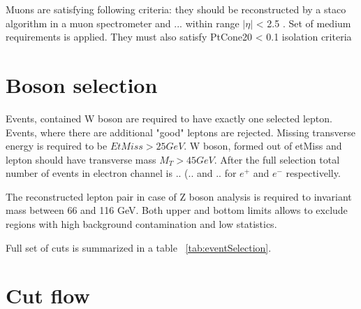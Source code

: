 Muons are satisfying following criteria: they should be reconstructed by a staco algorithm in a muon spectrometer and ... within range $|\eta|$ < 2.5 . Set of medium requirements is applied. They must also satisfy PtCone20 < 0.1 isolation criteria

\section{Boson selection}
Events, contained W boson are required to have exactly one selected lepton. Events, where there are additional "good" leptons are rejected. Missing transverse energy is required to be $EtMiss>25 GeV$.  W boson, formed out of etMiss and lepton should have transverse mass $M_T > 45 GeV$. After the full selection total number of events in electron channel is .. (.. and .. for $e^+$ and $e^-$ respectivelly. 

The reconstructed lepton pair in case of Z boson analysis is required to invariant mass between 66 and 116 GeV. Both upper and bottom limits allows to exclude regions with high background contamination and low statistics. 

Full set of cuts is summarized in a table ~\ref{tab:eventSelection}.

\section{Cut flow}




